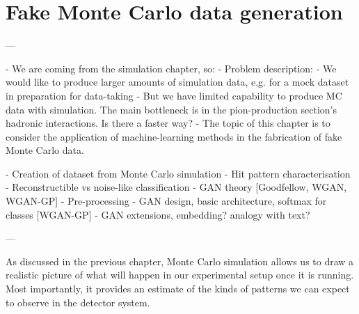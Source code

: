 \chapter{Fake Monte Carlo data generation}
\begin{markdown}
---

- We are coming from the simulation chapter, so:
- Problem description: 
 - We would like to produce larger amounts of simulation data, e.g. for a mock dataset in preparation for data-taking
 - But we have limited capability to produce MC data with simulation. The main bottleneck is in the pion-production section's hadronic interactions. Is there a faster way?
  - The topic of this chapter is to consider the application of machine-learning methods in the fabrication of fake Monte Carlo data.


- Creation of dataset from Monte Carlo simulation
  - Hit pattern characterisation
  - Reconstructible vs noise-like classification
- GAN theory [Goodfellow, WGAN, WGAN-GP]
 - Pre-processing
- GAN design, basic architecture, softmax for classes [WGAN-GP]
- GAN extensions, embedding? analogy with text?

---
\end{markdown}


As discussed in the previous chapter, Monte Carlo simulation allows us to draw a realistic picture of what will happen in our experimental setup once it is running. Most importantly, it provides an estimate of the kinds of patterns we can expect to observe in the detector system. 

